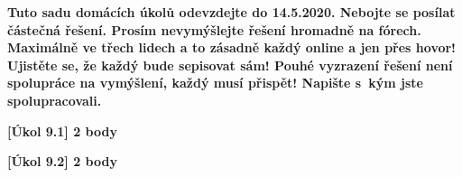 \textbf{
	Tuto sadu domácích úkolů odevzdejte do 14.5.2020.
	Nebojte se posílat částečná řešení.
	Prosím nevymýšlejte řešení hromadně na fórech.
	Maximálně ve třech lidech a to zásadně každý online a jen přes hovor!
	Ujistěte se, že každý bude sepisovat sám!
	Pouhé vyzrazení řešení není spolupráce na vymýšlení, každý musí přispět!
	Napište s~kým jste spolupracovali.
}

\textbf{[Úkol 9.1] 2 body}

\textbf{[Úkol 9.2] 2 body}


